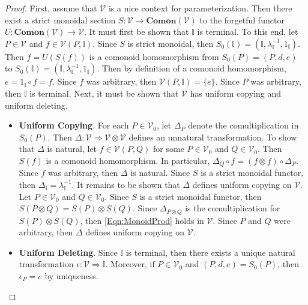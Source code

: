 \begin{proof}
    First, assume that $\mathcal{V}$ is a nice context for parameterization.
    Then there exist a strict monoidal section $S: \mathcal{V} \to \mathbf{Comon}( \mathcal{V} )$ to the forgetful functor $U: \mathbf{Comon}( \mathcal{V} ) \to \mathcal{V}$.
    It must first be shown that $\mathbb{I}$ is terminal.
    To this end, let $P \in \mathcal{V}$ and $f \in \mathcal{V}( P, \mathbb{I} )$.
    Since $S$ is strict monoidal, then $S_0( \mathbb{I} ) = ( \mathbb{I}, \lambda_{\mathbb{I}}^{-1}, 1_{\mathbb{I}} )$.
    Then $f = U( S( f ) )$ is a comonoid homomorphism from $S_0( P ) = ( P, d, e )$ to $S_0( \mathbb{I} ) = ( \mathbb{I}, \lambda_{\mathbb{I}}^{-1}, 1_{\mathbb{I}} )$.
    Then by definition of a comonoid homomorphism, $e = 1_{\mathbb{I}} \circ f = f$.
    Since $f$ was arbitrary, then $\mathcal{V}( P, \mathbb{I} ) = \{ e \}$.
    Since $P$ was arbitrary, then $\mathbb{I}$ is terminal.
    Next, it must be shown that $\mathcal{V}$ has uniform copying and uniform deleting.
    \begin{itemize}
    \item \textbf{Uniform Copying}.
          For each $P \in \mathcal{V}_0$, let $\Delta_P$ denote the comultiplication in $S_0( P )$.
          Then $\Delta: \mathcal{V} \Rightarrow \mathcal{V} \otimes \mathcal{V}$ defines an unnatural transformation.
          To show that $\Delta$ is natural, let $f \in \mathcal{V}( P, Q )$ for some $P \in \mathcal{V}_0$ and $Q \in \mathcal{V}_0$.
          Then $S( f )$ is a comonoid homomorphism.
          In particular, $\Delta_Q \circ f = ( f \otimes f ) \circ \Delta_P$.
          Since $f$ was arbitrary, then $\Delta$ is natural.
          Since $S$ is a strict monoidal functor, then $\Delta_\mathbb{I} = \lambda_{\mathbb{I}}^{-1}$.
          It remains to be shown that $\Delta$ defines uniform copying on $\mathcal{V}$.
          Let $P \in \mathcal{V}_0$ and $Q \in \mathcal{V}_0$.
          Since $S$ is a strict monoidal functor, then $S( P \otimes Q ) = S( P ) \otimes S( Q )$.
          Since $\Delta_{P \otimes Q}$ is the comultiplication for $S( P ) \otimes S( Q )$, then \cref{Eqn:MonoidProd} holds in $\mathcal{V}$.
          Since $P$ and $Q$ were arbitrary, then $\Delta$ defines uniform copying on $\mathcal{V}$.
    \item \textbf{Uniform Deleting}.
          Since $\mathbb{I}$ is terminal, then there exists a unique natural transformation $\epsilon: \mathcal{V} \Rightarrow \mathbb{I}$.
          Moreover, if $P \in \mathcal{V}_0$ and $( P, d, e ) = S_0( P )$, then $\epsilon_P = e$ by uniqueness.

\end{itemize}
\end{proof}
